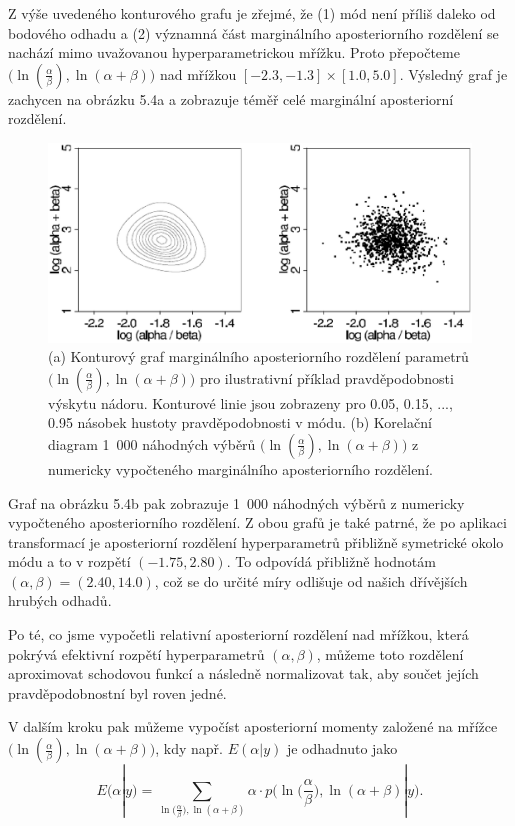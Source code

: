 Z výše uvedeného konturového grafu je zřejmé, že (1) mód není příliš daleko od bodového odhadu a (2) významná část marginálního aposteriorního rozdělení se nachází mimo uvažovanou hyperparametrickou mřížku. Proto přepočteme $\big(\ln(\frac{\alpha}{\beta}), \ln(\alpha + \beta) \big)$ nad mřížkou $[-2.3, -1.3] \times [1.0, 5.0]$. Výsledný graf je zachycen na obrázku 5.4a a zobrazuje téměř celé marginální aposteriorní rozdělení.
\begin{figure}[htp]
\centering
\includegraphics[scale = 0.45]{pictures/fig_5_3.eps}
\caption{(a) Konturový graf marginálního aposteriorního rozdělení parametrů $\big(\ln(\frac{\alpha}{\beta}), \ln(\alpha + \beta) \big)$ pro ilustrativní příklad pravděpodobnosti výskytu nádoru. Konturové linie jsou zobrazeny pro 0.05, 0.15, ..., 0.95 násobek hustoty pravděpodobnosti v módu. (b) Korelační diagram 1~000 náhodných výběrů $\big(\ln(\frac{\alpha}{\beta}), \ln(\alpha + \beta) \big)$ z numericky vypočteného marginálního aposteriorního rozdělení.}
\label{fig_5_3}
\end{figure}
Graf na obrázku 5.4b pak zobrazuje 1~000 náhodných výběrů z numericky vypočteného aposteriorního rozdělení. Z obou grafů je také patrné, že po aplikaci transformací je aposteriorní rozdělení hyperparametrů přibližně symetrické okolo módu a to v rozpětí $(-1.75, 2.80)$. To odpovídá přibližně hodnotám $(\alpha, \beta) = (2.40, 14.0)$, což se do určité míry odlišuje od našich dřívějších hrubých odhadů.

Po té, co jsme vypočetli relativní aposteriorní rozdělení nad mřížkou, která pokrývá efektivní rozpětí hyperparametrů $(\alpha, \beta)$, můžeme toto rozdělení aproximovat schodovou funkcí a následně normalizovat tak, aby součet jejích pravděpodobnostní byl roven jedné.

V dalším kroku pak můžeme vypočíst aposteriorní momenty založené na mřížce $\big(\ln(\frac{\alpha}{\beta}), \ln(\alpha + \beta) \big)$, kdy např. $E(\alpha | y)$ je odhadnuto jako
\begin{equation}
E(\alpha | y) = \sum_{\ln\big(\frac{\alpha}{\beta}\big), \ln(\alpha + \beta)} \alpha \cdot p\Big(\ln\big(\frac{\alpha}{\beta}\big), \ln(\alpha + \beta) | y \Big).
\end{equation}

